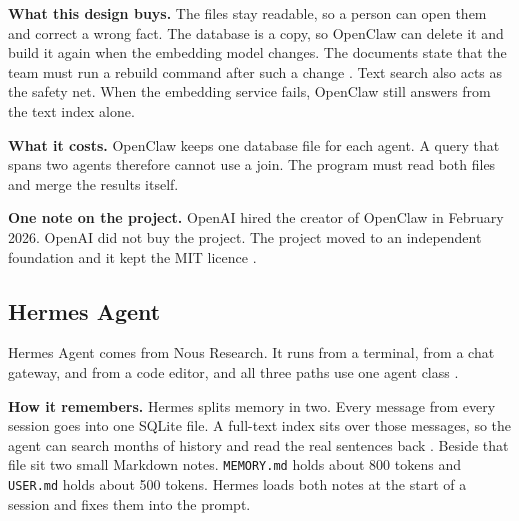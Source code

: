 \documentclass[11pt,a4paper]{article}
\newcommand{\code}[1]{\texttt{\small #1}}
\begin{document}
\textbf{What this design buys.} The files stay readable, so a person can
open them and correct a wrong fact. The database is a copy, so OpenClaw
can delete it and build it again when the embedding model changes. The
documents state that the team must run a rebuild command after such a
change \cite{openclawMemCfg}. Text search also acts as the safety net.
When the embedding service fails, OpenClaw still answers from the text
index alone.

\textbf{What it costs.} OpenClaw keeps one database file for each agent.
A query that spans two agents therefore cannot use a join. The program
must read both files and merge the results itself.

\textbf{One note on the project.} OpenAI hired the creator of OpenClaw in
February 2026. OpenAI did not buy the project. The project moved to an
independent foundation and it kept the MIT licence
\cite{tcOpenClaw,forbesOpenClaw}.

\subsection{Hermes Agent}
\label{sec:hermes}

Hermes Agent comes from Nous Research. It runs from a terminal, from a
chat gateway, and from a code editor, and all three paths use one agent
class \cite{hermesArch}.

\textbf{How it remembers.} Hermes splits memory in two. Every message
from every session goes into one SQLite file. A full-text index sits over
those messages, so the agent can search months of history and read the
real sentences back \cite{hermesMemory}. Beside that file sit two small
Markdown notes. \code{MEMORY.md} holds about 800 tokens and
\code{USER.md} holds about 500 tokens. Hermes loads both notes at the
start of a session and fixes them into the prompt.
\end{document}
